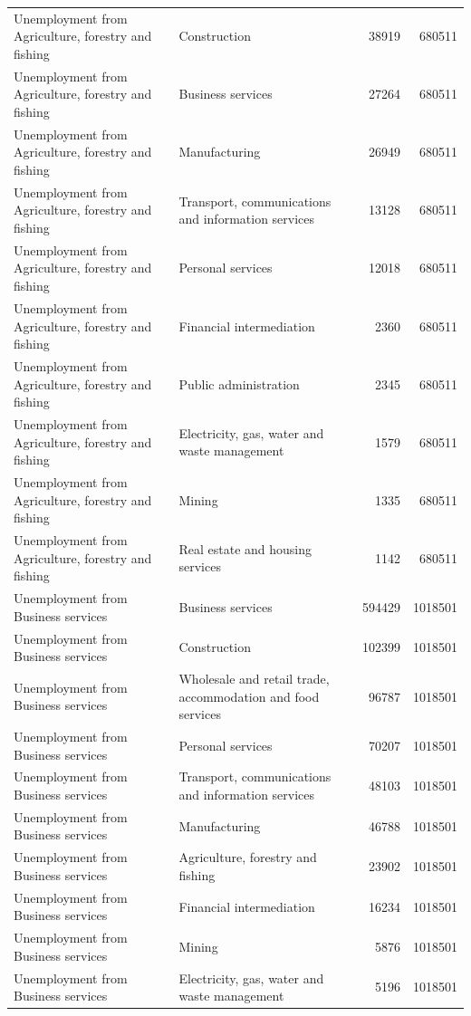 \begin{longtable}{llrr}
Unemployment from Agriculture, forestry and fishing & Construction & 38919 & 680511 \\
Unemployment from Agriculture, forestry and fishing & Business services & 27264 & 680511 \\
Unemployment from Agriculture, forestry and fishing & Manufacturing & 26949 & 680511 \\
Unemployment from Agriculture, forestry and fishing & Transport, communications and information services & 13128 & 680511 \\
Unemployment from Agriculture, forestry and fishing & Personal services & 12018 & 680511 \\
Unemployment from Agriculture, forestry and fishing & Financial intermediation & 2360 & 680511 \\
Unemployment from Agriculture, forestry and fishing & Public administration & 2345 & 680511 \\
Unemployment from Agriculture, forestry and fishing & Electricity, gas, water and waste management & 1579 & 680511 \\
Unemployment from Agriculture, forestry and fishing & Mining & 1335 & 680511 \\
Unemployment from Agriculture, forestry and fishing & Real estate and housing services & 1142 & 680511 \\
Unemployment from Business services & Business services & 594429 & 1018501 \\
Unemployment from Business services & Construction & 102399 & 1018501 \\
Unemployment from Business services & Wholesale and retail trade, accommodation and food services & 96787 & 1018501 \\
Unemployment from Business services & Personal services & 70207 & 1018501 \\
Unemployment from Business services & Transport, communications and information services & 48103 & 1018501 \\
Unemployment from Business services & Manufacturing & 46788 & 1018501 \\
Unemployment from Business services & Agriculture, forestry and fishing & 23902 & 1018501 \\
Unemployment from Business services & Financial intermediation & 16234 & 1018501 \\
Unemployment from Business services & Mining & 5876 & 1018501 \\
Unemployment from Business services & Electricity, gas, water and waste management & 5196 & 1018501 \\

\end{longtable}
